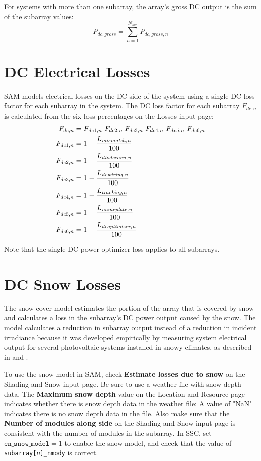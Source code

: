 \documentclass[12pt,letterpaper]{article}
\begin{document}
For systems with more than one subarray, the array's gross DC output is the sum of the subarray values:
\begin{equation}
P_{dc,gross} = \sum_{n=1}^{N_{sub}} P_{dc,gross,n}
\end{equation}

\section{DC Electrical Losses} \label{sec-dclosses}

SAM models electrical losses on the DC side of the system using a single DC loss factor for each subarray in the system. The DC loss factor for each subarray $F_{dc,n}$ is calculated from the six loss percentages on the Losses input page:
\begin{align}\label{eqn-dcderate}
F_{dc,n} &= F_{dc1,n}~F_{dc2,n}~F_{dc3,n}~F_{dc4,n}~F_{dc5,n}~F_{dc6,n} \notag\\
F_{dc1,n} &= 1-\frac{L_{\textit{mismatch,n}}}{100} \notag\\
F_{dc2,n} &= 1-\frac{L_{\textit{diodeconn,n}}}{100} \notag\\
F_{dc3,n} &= 1-\frac{L_{\textit{dcwiring,n}}}{100} \notag\\
F_{dc4,n} &= 1-\frac{L_{\textit{tracking,n}}}{100} \notag\\
F_{dc5,n} &= 1-\frac{L_{\textit{nameplate,n}}}{100} \notag\\
F_{dc6,n} &= 1-\frac{L_{\textit{dcoptimizer,n}}}{100}
\end{align}

Note that the single DC power optimizer loss applies to all subarrays.

\section{DC Snow Losses}\label{sec-snow}

The snow cover model estimates the portion of the array that is covered by snow and calculates a loss in the subarray's DC power output caused by the snow. The model calculates a reduction in subarray output instead of a reduction in incident irradiance because it was developed empirically by measuring system electrical output for several photovoltaic systems installed in snowy climates, as described in \citet{marion-snowmodel} and \citet{ryberg-snowmodel}.

To use the snow model in SAM, check \textbf{Estimate losses due to snow} on the Shading and Snow input page. Be sure to use a weather file with snow depth data. The \textbf{Maximum snow depth} value on the Location and Resource page indicates whether there is snow depth data in the weather file: A value of "NaN" indicates there is no snow depth data in the file. Also make sure that the \textbf{Number of modules along side} on the Shading and Snow input page is consistent with the number of modules in the subarray. In SSC, set $\texttt{en\_snow\_model} = 1$ to enable the snow model, and check that the value of \texttt{subarray[\textit{n}]\_nmody} is correct.
\end{document}
